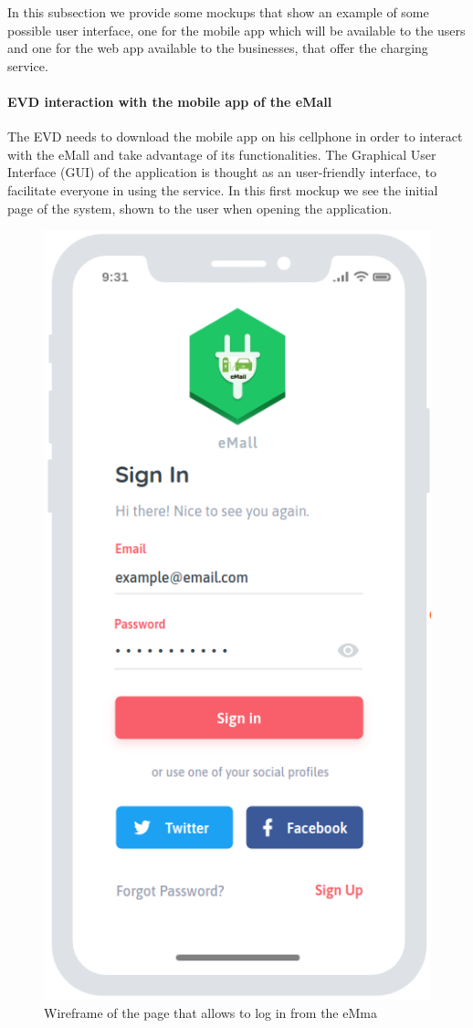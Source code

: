 In this subsection we provide some mockups that show an example of some possible user interface, one for the mobile app which will be available to the users and one for the web app available to the businesses, that offer the charging service.

\paragraph{EVD interaction with the mobile app of the eMall}
The EVD needs to download the mobile app on his cellphone in order to interact with the eMall and take advantage of its functionalities. The Graphical User Interface (GUI) of the application is thought as an user-friendly interface, to facilitate everyone in using the service. In this first mockup we see the initial page of the system, shown to the user when opening the application.
\begin{figure}[H]
    \centering
    \includegraphics[scale=.3]{Images/cp3/signIn.png}
    \caption{Wireframe of the page that allows to log in from the eMma}
\end{figure}

